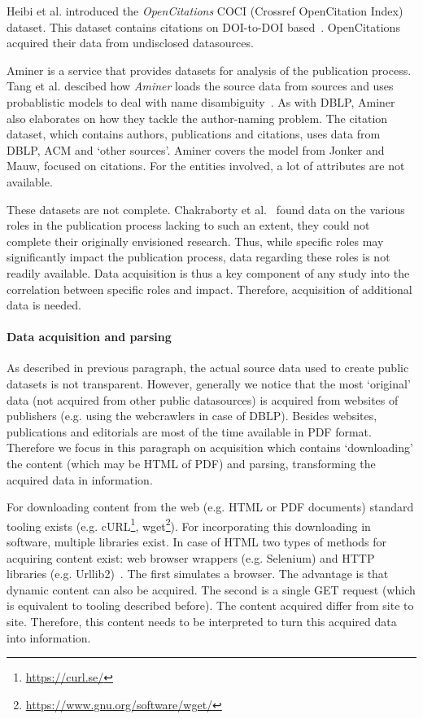 \documentclass{ou-report}
\newcommand{\dblp}{DBLP}
\begin{document}
Heibi et al. introduced the \emph{OpenCitations} COCI (Crossref OpenCitation 
Index) dataset. This dataset contains citations on DOI-to-DOI
based~\cite{DBLP:journals/scientometrics/HeibiPS19}.
OpenCitations acquired their data from undisclosed datasources.

Aminer is a service that provides datasets for analysis of the publication
process.
Tang et al. descibed how \emph{Aminer} loads the source data from sources and 
uses probablistic models to deal with name disambiguity~\cite{Tang:08KDD}. As 
with DBLP, Aminer also elaborates on how they tackle the author-naming problem.
The citation dataset, which contains authors, publications and citations, uses
data from DBLP, ACM and `other sources'. 
Aminer covers the model from Jonker and Mauw, focused on citations. For the 
entities involved, a lot of attributes are not available.

These datasets are not complete. Chakraborty et al.~\cite{CPN2021} found 
data on the various
roles in the publication process lacking to such an extent, they could not complete
their originally envisioned research. Thus, while specific roles may significantly
impact the publication process, data regarding these roles is not readily available.
Data acquisition is thus a key component of any study into the correlation between
specific roles and impact.
Therefore, acquisition of additional data is needed.

\paragraph{Data acquisition and parsing}
As described in previous paragraph, the actual source data used to create public
datasets is not transparent. However, generally we notice that the most
`original' data (not acquired from other public datasources) is acquired from
websites of publishers (e.g. using the webcrawlers in case of \dblp{}). 
Besides websites, publications and editorials are most of the time available in
PDF format. Therefore we focus in this paragraph on acquisition which contains
`downloading' the content (which may be HTML of PDF) and parsing, transforming
the acquired data in information.

For downloading content from the web (e.g. HTML or PDF documents) standard
tooling exists (e.g. cURL\footnote{\url{https://curl.se/}},
wget\footnote{\url{https://www.gnu.org/software/wget/}}). For incorporating this
downloading in software, multiple libraries exist.
In case of HTML two types of methods for acquiring content exist: web browser
wrappers (e.g. Selenium) and HTTP libraries (e.g. Urllib2)~\cite{zhao2017}. The
first simulates a browser. The advantage is that dynamic content can also be
acquired. The second is a single GET request (which is equivalent to tooling
described before).
The content acquired differ from site to site. Therefore, this content needs to
be interpreted to turn this acquired data into information.
\end{document}
